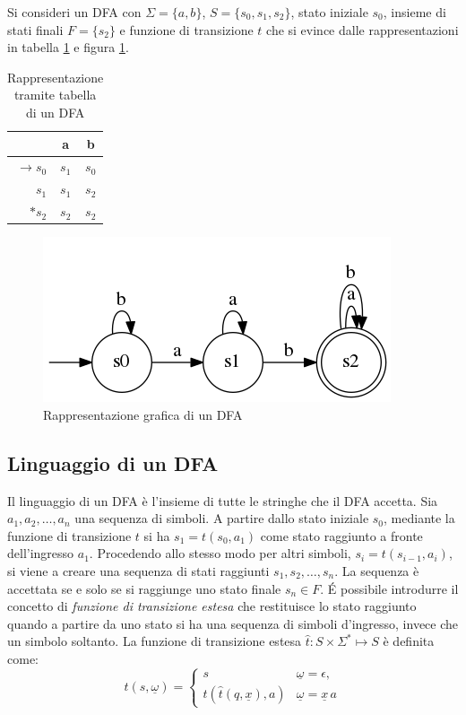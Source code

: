 \begin{ex}
Si consideri un DFA con $\Sigma = \{ a,b\}$, $S = \{ s_0,s_1,s_2\}$, stato iniziale $s_0$, insieme di stati finali $F = \{s_2\}$ e funzione di transizione $t$ che si evince dalle rappresentazioni in tabella \ref{tab:dfa} e figura \ref{fig:dfa}.

\begin{table}[htbp]
\begin{center}
\begin{tabular}{r | c  c}
& a & b \\ \hline
$\rightarrow s_0$ & $s_1$ & $s_0$ \\
$s_1$ & $s_1$ & $s_2$ \\
$*s_2$ & $s_2$ & $s_2$ 
\end{tabular}
\caption{Rappresentazione tramite tabella di un DFA}
\label{tab:dfa}
\end{center}
\end{table}


\begin{figure}[htbp]
\centering
\includegraphics[scale=0.4]{./Img/automi/ex1.png}
\caption{Rappresentazione grafica di un DFA}
\label{fig:dfa}
\end{figure}

\end{ex}

\subsection{Linguaggio di un DFA}
Il linguaggio di un DFA è l'insieme di tutte le stringhe che il DFA accetta. 
Sia $a_1, a_2, \dots, a_n$ una sequenza di simboli. A partire dallo stato iniziale $s_0$, mediante la funzione di transizione $t$ si ha $s_1 = t(s_0, a_1)$ come stato raggiunto a fronte dell'ingresso $a_1$. Procedendo allo stesso modo per altri simboli, $s_i = t(s_{i-1}, a_i)$, si viene a creare una sequenza di stati raggiunti  $s_1, s_2, \dots, s_n$. La sequenza è accettata se e solo se si raggiunge uno stato finale $s_n \in F$.
\'E possibile introdurre il concetto di \emph{funzione di transizione estesa} che restituisce lo stato raggiunto quando a partire da uno stato si ha una sequenza di simboli d'ingresso, invece che un simbolo soltanto. La funzione di transizione estesa $\hat t: S \times \Sigma^* \mapsto S$ è definita come:
$$
\hat t(s, \underline \omega) = \begin{cases}
s & \underline \omega = \epsilon,\\
t(\hat t(q, \underline x), a) & \underline \omega = \underline x\,a
\end{cases}
$$

